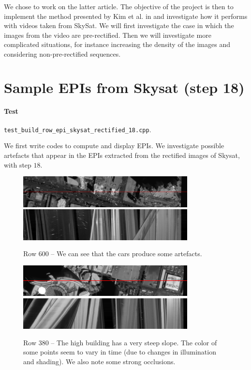 \documentclass{article}
\def\epiWidth{0.8}
\theoremstyle{definition}
\begin{document}
We chose to work on the latter article. The objective of the project is then to implement the method presented by Kim et al. in \cite{art:kim13:lfields} and investigate how it performs with videos taken from SkySat. We will first investigate the case in which the images from the video are pre-rectified. Then we will investigate more complicated situations, for instance increasing the density of the images and considering non-pre-rectified sequences.


\section{Sample EPIs from Skysat (step 18)}


\paragraph{Test} \verb#test_build_row_epi_skysat_rectified_18.cpp#.


We first write codes to compute and display EPIs. We investigate possible artefacts that appear in the EPIs extracted from the rectified images of Skysat, with step $18$.


\begin{figure}[ht]
  \centering
  \includegraphics[width=\epiWidth\textwidth]{images/1519991014186_1st.png}\\
  \includegraphics[width=\epiWidth\textwidth]{images/1519991014186_epi.png}
  \caption{Row 600 -- We can see that the cars produce some artefacts.}
\end{figure}


\begin{figure}[ht]
  \centering
  \includegraphics[width=\epiWidth\textwidth]{images/1519991030012_1st.png}\\
  \includegraphics[width=\epiWidth\textwidth]{images/1519991030012_epi.png}
  \caption{Row 380 -- The high building has a very steep slope. The color of some points seem to vary in time (due to changes in illumination and shading). We also note some strong occlusions.}
\end{figure}
\end{document}
